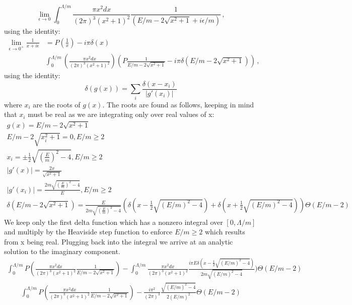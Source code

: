 \begin{equation}
    \lim_{\epsilon \to 0} \int^{\Lambda/m}_0 \frac{\pi x^2 dx}{(2\pi)^3(x^2+1)^2}\frac{1}{(E/m-2\sqrt{x^2+1}+i\epsilon/m)}\,,
\end{equation}
using the identity:
\begin{align}    
\lim_{\epsilon \to 0^+} \frac{1}{x+i\epsilon} &= P(\frac{1}{x}) - i\pi\delta(x)\\
     &\int^{\Lambda/m}_0 (\frac{\pi x^2 dx}{(2\pi)^3(x^2+1)^2})
     \left(P\frac{1}{E/m-2\sqrt{x^2+1}} - i\pi\delta(E/m-2\sqrt{x^2+1})\right)\,,
\end{align}
using the identity:
\begin{equation}
\delta(g(x)) = \sum_{i} \frac{\delta(x-x_i)}{|g'(x_i)|}
\end{equation}
where $x_i$ are the roots of $g(x)$. The roots are found as follows, keeping in mind that $x_i$ must be real as we are integrating only over real values of x: 
\begin{align}
g(x) = E/m-2\sqrt{x^2+1}\\
E/m-2\sqrt{x_i^2+1} = 0, E/m \ge 2\\
x_i = \pm\frac{1}{2}\sqrt{\left(\frac{E}{m}\right)^2-4}, E/m \ge 2\\
|g'(x)| = \frac{2x}{\sqrt{x^2+1}}\\
|g'(x_i)| = \frac{2m\sqrt{\left(\frac{E}{m}\right)^2-4}}{E}, E/m \ge 2\\
\delta(E/m - 2\sqrt{x^2+1}) = \frac{E}{2m\sqrt{\left(\frac{E}{m}\right)^2-4}}(\delta(x-\frac{1}{2}\sqrt{(E/m)^2 - 4}) + \delta(x+\frac{1}{2}\sqrt{(E/m)^2 - 4}))\Theta(E/m-2)
\end{align}
We keep only the first delta function which has a nonzero integral over $[0,\Lambda/m]$ and multiply by the Heaviside step function to enforce $E/m \ge 2$ which results from x being real. Plugging back into the integral we arrive at an analytic solution to the imaginary component.
\begin{align}
     \int^{\Lambda/m}_0 P(\frac{\pi x^2 dx}{(2\pi)^3(x^2+1)^2}\frac{1}{E/m-2\sqrt{x^2+1}}) -  \int^{\Lambda/m}_0 \frac{\pi x^2 dx}{(2\pi)^3(x^2+1)^2}\frac{i\pi E\delta(x-\frac{1}{2}\sqrt{(E/m)^2 - 4})}{2m\sqrt{(E/m)^2 - 4}})\Theta(E/m-2)
\end{align}
\begin{align}
     \int^{\Lambda/m}_0 P(\frac{\pi x^2 dx}{(2\pi)^3(x^2+1)^2}\frac{1}{E/m-2\sqrt{x^2+1}}) - \frac{i\pi^2}{(2\pi)^3}\frac{\sqrt{(E/m)^2-4}}{2(E/m)^2}\Theta(E/m-2)
\end{align}
